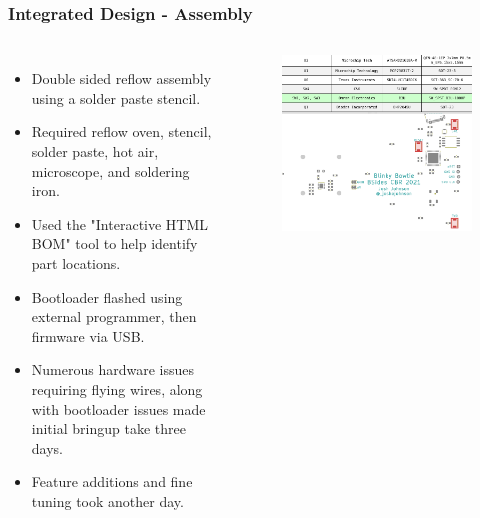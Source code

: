 \documentclass[aspectratio=169, t]{beamer}
\begin{document}
\begin{frame}
\frametitle{Integrated Design - Assembly}
\vspace{-5mm}
\begin{columns}
	\begin{itemize}
		\item Double sided reflow assembly using a solder paste stencil.
		\item Required reflow oven, stencil, solder paste, hot air, microscope, and soldering iron.
		\item Used the "Interactive HTML BOM" tool to help identify part locations.
		\item Bootloader flashed using external programmer, then firmware via USB.
		\item Numerous hardware issues requiring flying wires, along with bootloader issues made initial bringup take three days.
		\item Feature additions and fine tuning took another day.
	\end{itemize}
	\begin{figure}
		\includegraphics[width=\linewidth]{images/ibom.png}
	\end{figure}
\end{columns}
\end{frame}
\end{document}
